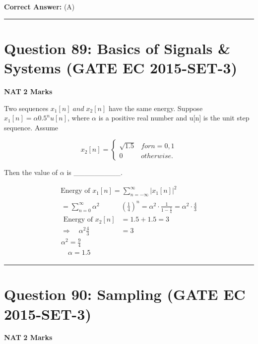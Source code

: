 \documentclass[11pt,a4paper]{article}
\begin{document}
\noindent \textbf{Correct Answer:} (A)


\vspace{1.5em}
\hrule
\vspace{1.5em}

\section*{Question 89: Basics of Signals \& Systems (GATE EC 2015-SET-3)}
\noindent \textbf{\color{primary}NAT} \hfill \textbf{\color{secondary}2 Marks}


\noindent Two sequences $x_{1}[n] \; and \; x_{2}[n]$ have the same energy. Suppose $x_{1}[n] = \alpha 0.5^{n} u[n]$, where $\alpha$ is a positive real number and u[n] is the unit step sequence. Assume  

\[
x_{2}[n]=\left\{\begin{matrix} \sqrt{1.5} &for n=0,1 \\ 0 & otherwise. \end{matrix}\right.
\]
 
  Then the value of $\alpha$ is \_\_\_\_\_\_\_\_\_.


\begin{tcolorbox}[solbox, title=Detailed Solution -- Question 89]
\[
\begin{array}{l} \text { Energy of } x_{1}[n]=\sum_{n=-\infty}^{\infty}\left|x_{1}[n]\right|^{2} \\ \begin{aligned} =\sum_{n=0}^{\infty} \alpha^{2} &\left(\frac{1}{4}\right)^{n}=\alpha^{2} \cdot \frac{1}{1-\frac{1}{4}}=\alpha^{2} \cdot \frac{4}{3} \\ \text { Energy of } x_{2}[n] &=1.5+1.5=3 \\ \Rightarrow \quad \alpha^{2} \frac{4}{3} &=3 \\ \alpha^{2}=\frac{9}{4} \\ \quad \alpha=1.5 \end{aligned} \end{array}
\]
\end{tcolorbox}

\vspace{1.5em}
\hrule
\vspace{1.5em}

\section*{Question 90: Sampling (GATE EC 2015-SET-3)}
\noindent \textbf{\color{primary}NAT} \hfill \textbf{\color{secondary}2 Marks}
\end{document}
